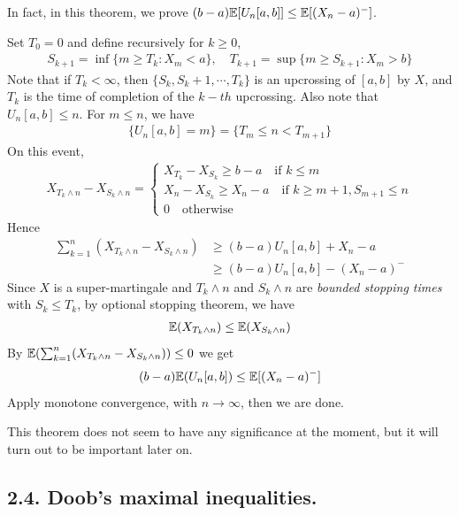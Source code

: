 \documentclass[12pt,a4paper]{report}
\newenvironment{proof}
{\begin{changemargin}{1cm}{0.5cm} 
	}%
	{\end{changemargin}
}
\begin{document}
In fact, in this theorem, we prove $(b-a) \mathbb{E}[U_n[a,b]] \leq  \mathbb{E}[(X_n-a)^{-}]$.
\begin{proof}
\pf Set $T_0 =0$ and define recursively for $k\geq 0$,
\begin{align*}
S_{k+1} = \inf \{m\geq T_k : X_m <a \}, \quad T_{k+1} = \sup \{m\geq S_{k+1} : X_m >b \}
\end{align*}
Note that if $T_k < \infty$, then $\{S_k, S_{k}+1,\cdots, T_k \}$ is an upcrossing of $[a,b]$ by $X$, and $T_k$ is the time of completion of the $k-th$ upcrossing. Also note that $U_n [a,b] \leq n$. For $m\leq n$, we have
\begin{align*}
\{U_n[a,b] =m \} = \{T_m \leq n < T_{m+1} \}
\end{align*}
On this event,
\begin{align*}
X_{T_k \wedge n}  - X_{S_k \wedge n} = \begin{cases}
X_{T_k} - X_{S_k} \geq b-a \quad \text{if } k\leq m \\
X_n - X_{S_k} \geq X_n -a \quad \text{if } k \geq m+1, S_{m+1} \leq n \\
0 \quad \text{otherwise}
\end{cases}
\end{align*}
Hence
\begin{align*}
\sum_{k=1}^n (X_{T_k \wedge n} - X_{S_k \wedge n}) &\geq (b-a) U_n[a,b] + X_n - a \\
&\geq (b-a)U_n[a,b] -(X_n -a)^-
\end{align*}
Since $X$ is a super-martingale and $T_k \wedge n$ and $S_k \wedge n$ are \emph{bounded stopping times} with $S_k \leq T_k$, by optional stopping theorem, we have
\begin{align*}
\mathbb{E} (X_{T_k \wedge n})\leq \mathbb{E}(X_{S_k \wedge n})
\end{align*}
By $\mathbb{E}(\sum_{k=1}^n (X_{T_k \wedge n} - X_{S_k \wedge n})) \leq 0$ we get
\begin{align*}
(b-a) \mathbb{E}(U_n[a,b]) \leq  \mathbb{E}[(X_n-a)^-]
\end{align*}
Apply monotone convergence, with $n\rightarrow \infty$, then we are done.

\eop
\end{proof}
\s

This theorem does not seem to have any significance at the moment, but it will turn out to be important later on.

\subsection*{2.4. Doob's maximal inequalities.}
\end{document}
